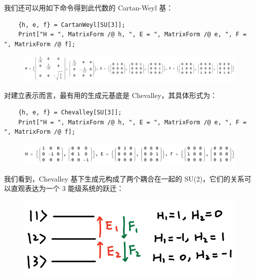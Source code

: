 \documentclass[UTF8]{ctexart}
\begin{document}
\noindent 我们还可以用如下命令得到此代数的 Cartan-Weyl 基：
\begin{verbatim}
	{h, e, f} = CartanWeyl[SU[3]];
	Print["H = ", MatrixForm /@ h, ", E = ", MatrixForm /@ e, ", F = ", MatrixForm /@ f];
\end{verbatim}

\begin{figure}[H]
\noindent \includegraphics[width=0.95\linewidth]{include/O2}
\end{figure}

\noindent 对建立表示而言，最有用的生成元基底是 Chevalley，其具体形式为：

\begin{verbatim}
	{h, e, f} = Chevalley[SU[3]];
	Print["H = ", MatrixForm /@ h, ", E = ", MatrixForm /@ e, ", F = ", MatrixForm /@ f];
\end{verbatim}

\begin{figure}[H]
\begin{centering}
\includegraphics[width=0.95\linewidth]{include/O3}
\par\end{centering}
\end{figure}

\noindent 我们看到，Chevalley 基下生成元构成了两个耦合在一起的 SU(2)，它们的关系可以直观表达为一个 3 能级系统的跃迁：

\begin{figure}[H]
\begin{centering}
\includegraphics[width=0.5\linewidth]{include/P1}
\par\end{centering}
\end{figure}
\end{document}
